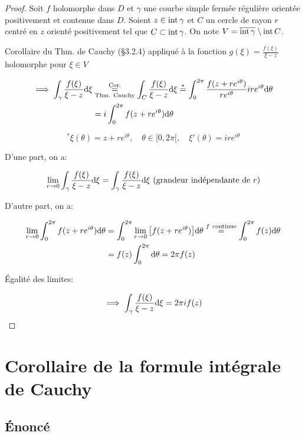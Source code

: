 \begin{proof}
Soit $f$ holomorphe dans $D$ et $\gamma$ une courbe simple fermée régulière orientée positivement et contenue dans $D$.
Soient $z \in \textrm{int}\, \gamma$ et $C$ un cercle de rayon $r$ centré en $z$ orienté positivement tel que $C \subset \textrm{int}\, \gamma$.
On note $V = \overline{\textrm{int}\, \gamma} \setminus \textrm{int}\, C$.

Corollaire du Thm. de Cauchy (§3.2.4) appliqué à la fonction $g(\xi) = \frac{f(\xi)}{\xi - z}$ holomorphe pour $\xi \in V$ 

\begin{align*}
\implies \int_\gamma \frac{f(\xi)}{\xi - z} \mathrm{d}\xi
&\overset{\textrm{Cor.}}{\underset{\textrm{Thm. Cauchy}}{=}}
\int_C \frac{f(\xi)}{\xi - z} \mathrm{d}\xi
\overset{\ast}{=}
\int_0^{2\pi} \frac{f(z + re^{i\theta})}{re^{i\theta}}ire^{i\theta} \mathrm{d}\theta
\\&=
i \int_0^{2\pi} f(z + re^{i\theta}) \mathrm{d}\theta
\end{align*}

\[^\ast \xi(\theta) = z + re^{i\theta},
\quad \theta \in [0, 2\pi[,
\quad \xi'(\theta) = ire^{i\theta}\]

D'une part, on a:

\[
\lim_{r \rightarrow 0} \int_\gamma \frac{f(\xi)}{\xi - z} \dxi = \int_\gamma \frac{f(\xi)}{\xi - z} \dxi \ \textrm{(grandeur indépendante de $r$)}
\]

D'autre part, on a:

\begin{align*}
\lim_{r \rightarrow 0} \int_0^{2\pi} f(z + re^{i\theta}) \mathrm{d}\theta &=
\int_0^{2\pi} \lim_{r \rightarrow 0} \big[f(z + re^{i\theta})\big] \mathrm{d}\theta
\overset{f \ \textrm{continue}}{=}
\int_0^{2\pi} f(z) \mathrm{d}\theta
\\&=
f(z) \int_0^{2\pi} \mathrm{d}\theta
= 2\pi f(z)
\end{align*}

Égalité des limites:

\[\implies \int_\gamma \frac{f(\xi)}{\xi - z} \mathrm{d}\xi = 2\pi i f(z)\]
\end{proof}

\section{Corollaire de la formule intégrale de Cauchy}

\subsection{Énoncé}

